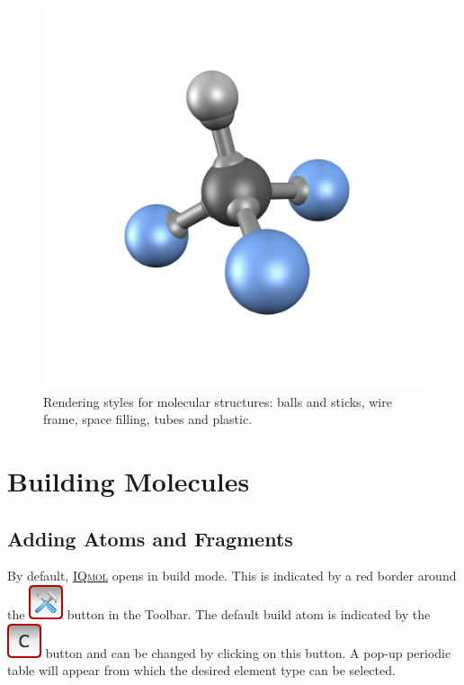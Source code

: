 \documentclass[a4paper,12pt]{article}
\newcommand{\iqmol}{\href{https://www.iqmol.org}{{\scshape IQmol}}}
\begin{document}
\begin{figure}[h]
\begin{center}
\includegraphics[scale=0.18]{figures/CHF3-moly.png}
\caption{Rendering styles for molecular structures: balls and sticks, wire frame,
space filling, tubes and plastic.}
\label{fig:styles}
\end{center}
\end{figure}



\newpage
\section{Building Molecules}


\subsection{Adding Atoms and Fragments}

By default, \iqmol{} opens in build mode.  This is indicated by a red border
around the \includegraphics[scale=0.40]{figures/BuildButton.png} button in the
Toolbar.   The default build atom is indicated by the
\includegraphics[scale=0.40]{figures/BuildAtomButton.png} button and can be changed
by clicking on this button.  A pop-up periodic table will appear from which the
desired element type can be selected.
\end{document}
